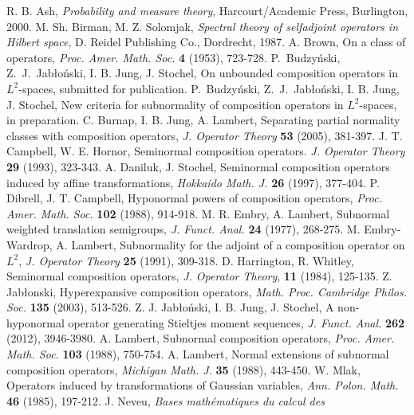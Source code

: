 \documentclass[draft,reqno]{amsproc}
\numberwithin{equation}{section}
\theoremstyle{remark}
\theoremstyle{definition}
\begin{document}
   \begin{thebibliography}{99}
    R. B. Ash, {\em Probability and measure theory},
Harcourt/Academic Press, Burlington, 2000.
    M. Sh. Birman, M. Z. Solomjak,
{\it Spectral theory of selfadjoint operators in
Hilbert space}, D. Reidel Publishing Co., Dordrecht,
1987.
    A. Brown,  On a class of operators, {\em
Proc. Amer. Math. Soc.} {\bf 4} (1953), 723-728.
    P.\ Budzy\'{n}ski,
Z.\ J.\ Jab{\l}o\'nski, I. B. Jung, J. Stochel, On
unbounded composition operators in $L^2$-spaces,
submitted for publication.
    P.\ Budzy\'{n}ski,
Z.\ J.\ Jab{\l}o\'nski, I. B. Jung, J. Stochel, New
criteria for subnormality of composition operators in
$L^2$-spaces, in preparation.
    C. Burnap, I. B. Jung,
A. Lambert, Separating partial normality classes with
composition operators, {\em J. Operator Theory} {\bf
53} (2005), 381-397.
    J. T. Campbell, W. E. Hornor,
Seminormal composition operators. {\em J. Operator
Theory} {\bf 29} (1993), 323-343.
    A. Daniluk, J. Stochel, Seminormal
composition operators induced by affine
transformations, {\it Hokkaido Math. J.} {\bf 26}
(1997), 377-404.
    P. Dibrell, J. T. Campbell, Hyponormal powers
of composition operators, {\em Proc. Amer. Math. Soc.}
{\bf 102} (1988), 914-918.
     M. R. Embry, A. Lambert,
Subnormal weighted translation semigroups, {\em J.
Funct. Anal.} {\bf 24} (1977), 268-275.
     M. Embry-Wardrop, A. Lambert,
Subnormality for the adjoint of a composition operator
on $L^2$, {\em J. Operator Theory} {\bf 25} (1991),
309-318.
    D. Harrington, R. Whitley, Seminormal
composition operators, {\em J. Operator Theory}, {\bf
11} (1984), 125-135.
    Z. Jab{\l}onski, Hyperexpansive
composition operators, {\em Math. Proc. Cambridge
Philos. Soc.} {\bf 135} (2003), 513-526.
    Z. J. Jab{\l}o\'nski,  I. B. Jung,
J. Stochel, A non-hyponormal operator generating
Stieltjes moment sequences, {\em J. Funct. Anal.} {\bf
262} (2012), 3946-3980.
    A. Lambert, Subnormal composition operators,
{\em Proc. Amer. Math. Soc.} {\bf 103} (1988),
750-754.
    A. Lambert, Normal extensions of subnormal
composition operators, {\em Michigan Math. J.} {\bf
35} (1988), 443-450.
    W. Mlak, Operators induced by transformations of
Gaussian variables, {\em Ann. Polon. Math.} {\bf 46}
(1985), 197-212.
    J. Neveu, {\em Bases math\'ematiques du calcul des
}
\end{thebibliography}
\end{document}

